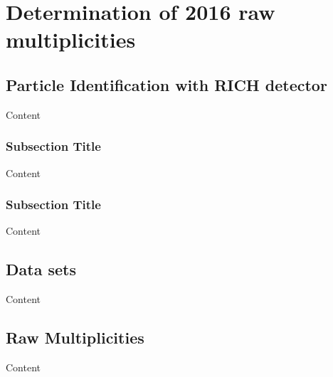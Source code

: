 
\chapter{Determination of 2016 raw multiplicities} %

\label{ch:raw} %


\section{Particle Identification with RICH detector}

Content


\subsection{Subsection Title}

Content


\subsection{Subsection Title}

Content


\section{Data sets}

Content


\section{Raw Multiplicities}

Content
